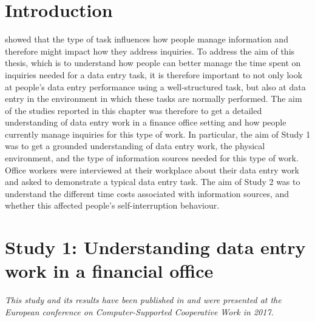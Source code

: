 \section{Introduction}
\citet{Bondarenko2005} showed that the type of task influences how people manage information and therefore might impact how they address inquiries. To address the aim of this thesis, which is to understand how people can better manage the time spent on inquiries needed for a data entry task, it is therefore important to not only look at people's data entry performance using a well-structured task, but also at data entry in the environment in which these tasks are normally performed. The aim of the studies reported in this chapter was therefore to get a detailed understanding of data entry work in a finance office setting and how people currently manage inquiries for this type of work. In particular, the aim of Study 1 was to get a grounded understanding of data entry work, the physical environment, and the type of information sources needed for this type of work. Office workers were interviewed at their workplace about their data entry work and asked to demonstrate a typical data entry task. The aim of Study 2 was to understand the different time costs associated with information sources, and whether this affected people's self-interruption behaviour. %

\section{Study 1: Understanding data entry work in a financial office}\label{st:Study1}
 
\textit{This study and its results have been published in \citet{Borghouts2017} and were presented at the European conference on Computer-Supported Cooperative Work in 2017.}
 
